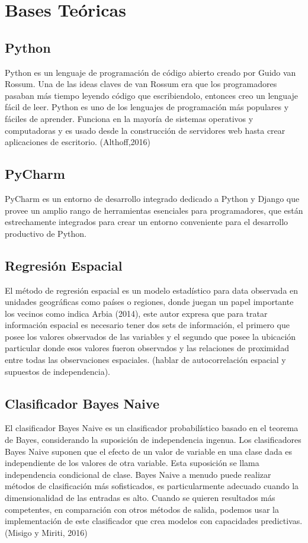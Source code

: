 \section{Bases Te\'oricas}

\subsection{Python}

Python es un lenguaje de programación de código abierto creado por Guido van Rossum. Una de las ideas claves de van Rossum era que los programadores pasaban más tiempo leyendo código que escribiendolo, entonces creo un lenguaje fácil de leer. Python es uno de los lenguajes de programación más populares y fáciles de aprender. Funciona en la mayoría de sistemas operativos y computadoras y es usado desde la construcción de servidores web hasta crear aplicaciones de escritorio. (Althoff,2016)

\subsection{PyCharm}
PyCharm es un entorno de desarrollo integrado dedicado a Python y Django que provee un amplio rango de herramientas esenciales para programadores, que están estrechamente integrados para crear un entorno conveniente para el desarrollo productivo de Python.

\subsection{Regresión Espacial}

El método de regresión espacial es un modelo estadístico para data observada en unidades geográficas como países o regiones, donde juegan un papel importante los vecinos como indica Arbia (2014), este autor expresa que para tratar información espacial es necesario tener dos sets de información, el primero que posee los valores observados de las variables y el segundo que posee la ubicación particular donde esos valores fueron observados y las relaciones de proximidad entre todas las observaciones espaciales. (hablar de autocorrelación espacial y supuestos de independencia).


\subsection{Clasificador Bayes Naive}

El clasificador Bayes Naive es un clasificador probabilístico basado en el teorema de Bayes, considerando la suposición de independencia ingenua. Los clasificadores Bayes Naive suponen que el efecto de un valor de variable en una clase dada es independiente de los valores de otra variable. Esta suposición se llama independencia condicional de clase. Bayes Naive a menudo puede realizar métodos de clasificación más sofisticados, es particularmente adecuado cuando la dimensionalidad de las entradas es alto. Cuando se quieren resultados más competentes, en comparación con otros métodos de salida, podemos usar la implementación de este clasificador que crea modelos con capacidades predictivas.
(Misigo y Miriti, 2016)

